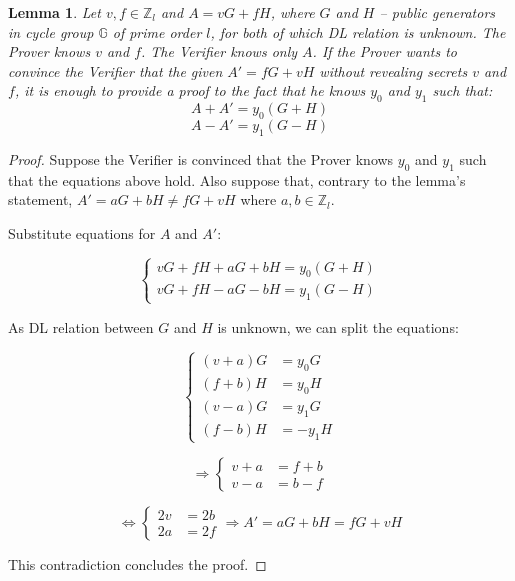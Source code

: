 \documentclass{article}
\numberwithin{figure}{section}
\begin{document}
\newtheorem{theorem}{Theorem}%
\newtheorem{corollary}{Corollary}[theorem]
\newtheorem{lemma}[theorem]{Lemma}


\begin{lemma} \label{l_AA'}
Let $v, f \in \mathbb{Z}_l$ and $A = vG + fH$, where $G$ and $H$ -- public generators in cycle group $\mathbb{G}$ of prime order $l$, for both of which DL relation is unknown. The Prover knows $v$ and $f$. The Verifier knows only $A$. If the Prover wants to convince the Verifier that the given $A' = fG + vH$ without revealing secrets $v$ and $f$, it is enough to provide a proof to the fact that he knows $y_0$ and $y_1$ such that:
\[ A + A' = y_0 (G+H) \]
\[ A - A' = y_1 (G-H) \]
\end{lemma}

\begin{proof}
Suppose the Verifier is convinced that the Prover knows $y_0$ and $y_1$ such that the equations above hold. Also suppose that, contrary to the lemma's statement, $A' = aG + bH \neq fG + vH$ where $a, b \in \mathbb{Z}_l$.

Substitute equations for $A$ and $A'$:

\begin{equation*}
    \left\{ \begin{aligned} 
        vG + fH + aG + bH = y_0 (G+H) \\
        vG + fH - aG - bH = y_1 (G-H)
    \end{aligned} \right.
\end{equation*}

As DL relation between $G$ and $H$ is unknown, we can split the equations:

\begin{equation*}
    \left\{ \begin{aligned} 
        (v + a) G &= y_0 G \\
        (f + b) H &= y_0 H \\
        (v - a) G &= y_1 G \\
        (f - b) H &= -y_1 H
    \end{aligned} \right.
\end{equation*}

\begin{equation*}
    \Rightarrow
    \left\{ \begin{aligned} 
        v + a &= f + b \\
        v - a &= b - f
    \end{aligned} \right.
\end{equation*}

\begin{equation*}
    \Leftrightarrow
    \left\{ \begin{aligned} 
        2v &= 2b \\
        2a &= 2f
    \end{aligned} \right.
    \Rightarrow A' = aG + bH = fG + vH 
\end{equation*}

This contradiction concludes the proof.

\end{proof}
\end{document}
